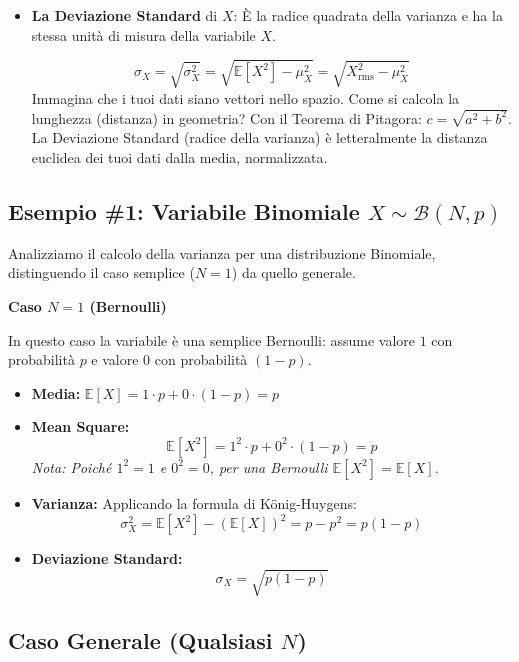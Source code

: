 \begin{itemize}
    Quindi: \textbf{Varianza = (Valore Quadratico Medio) - (Media al quadrato)}.

    \item \textbf{La Deviazione Standard} di $X$:
    È la radice quadrata della varianza e ha la stessa unità di misura della variabile $X$.
    
    \begin{equation}
    \sigma_X = \sqrt{\sigma_X^2} = \sqrt{\mathbb{E}[X^2] - \mu_X^2} = \sqrt{X^2_{\text{rms}} - \mu_X^2}
    \end{equation}
    Immagina che i tuoi dati siano vettori nello spazio. Come si calcola la lunghezza (distanza) in geometria? Con il Teorema di Pitagora: $c=\sqrt{a^2 + b^2}$.
    La Deviazione Standard (radice della varianza) è letteralmente la distanza euclidea dei tuoi dati dalla media, normalizzata.
\end{itemize}

\subsection{Esempio \#1: Variabile Binomiale $X \sim \mathcal{B}(N, p)$}
Analizziamo il calcolo della varianza per una distribuzione Binomiale, distinguendo il caso semplice ($N=1$) da quello generale.

\textbf{Caso $N=1$ (Bernoulli)}

In questo caso la variabile è una semplice Bernoulli: assume valore $1$ con probabilità $p$ e valore $0$ con probabilità $(1-p)$.

\begin{itemize}
    \item \textbf{Media:} $\mathbb{E}[X] = 1 \cdot p + 0 \cdot (1-p) = p$
    
    \item \textbf{Mean Square:}
    \[ \mathbb{E}[X^2] = 1^2 \cdot p + 0^2 \cdot (1-p) = p \]
    \textit{Nota: Poiché $1^2=1$ e $0^2=0$, per una Bernoulli $\mathbb{E}[X^2] = \mathbb{E}[X]$.}
    
    \item \textbf{Varianza:} Applicando la formula di König-Huygens:
    \[ \sigma_X^2 = \mathbb{E}[X^2] - (\mathbb{E}[X])^2 = p - p^2 = p(1-p) \]
    
    \item \textbf{Deviazione Standard:}
    \[ \sigma_X = \sqrt{p(1-p)} \]
\end{itemize}

\subsection{Caso Generale (Qualsiasi $N$)}

